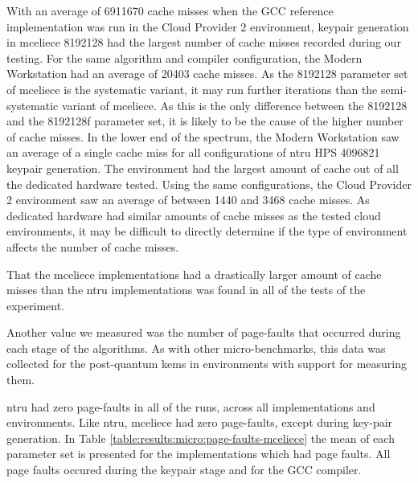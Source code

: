 

With an average of 6911670 cache misses when the GCC reference implementation was run in the Cloud Provider 2 environment, keypair generation in \gls{mceliece} 8192128 had the largest number of cache misses recorded during our testing. For the same algorithm and compiler configuration, the Modern Workstation had an average of 20403 cache misses. As the 8192128 parameter set of \gls{mceliece} is the systematic variant, it may run further iterations than the semi-systematic variant of \gls{mceliece}. As this is the only difference between the 8192128 and the 8192128f parameter set, it is likely to be the cause of the higher number of cache misses. In the lower end of the spectrum, the Modern Workstation saw an average of a single cache miss for all configurations of \gls{ntru} HPS 4096821 keypair generation. The environment had the largest amount of cache out of all the dedicated hardware tested. Using the same configurations, the Cloud Provider 2 environment saw an average of between 1440 and 3468 cache misses. As dedicated hardware had similar amounts of cache misses as the tested cloud environments, it may be difficult to directly determine if the type of environment affects the number of cache misses.

That the \gls{mceliece} implementations had a drastically larger amount of cache misses than the \gls{ntru} implementations was found in all of the tests of the experiment.

\clearpage
\noindent Another value we measured was the number of page-faults that occurred during each stage of the algorithms. As with other micro-benchmarks, this data was collected for the \gls{post-quantum} \glspl{kem} in environments with support for measuring them.

\gls{ntru} had zero page-faults in all of the runs, across all implementations and environments. Like \gls{ntru}, \gls{mceliece} had zero page-faults, except during key-pair generation. In Table \ref{table:results:micro:page-faults-mceliece} the mean of each parameter set is presented for the implementations which had page faults. All page faults occured during the keypair stage and for the GCC compiler.



